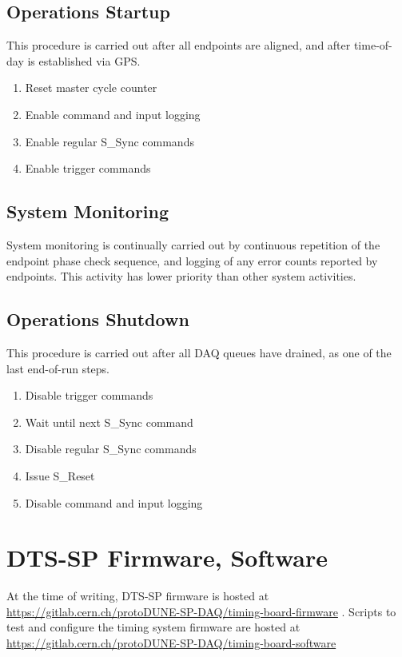 \documentclass{dune}
\begin{document}
\subsection{Operations Startup}

This procedure is carried out after all endpoints are aligned, and after time-of-day is established via GPS.

\begin{enumerate}
	\item Reset master cycle counter
	\item Enable command and input logging
	\item Enable regular S\_Sync commands
	\item Enable trigger commands
\end{enumerate}

\subsection{System Monitoring}

System monitoring is continually carried out by continuous repetition of the endpoint phase check sequence, and logging of any error counts reported by endpoints. This activity has lower priority than other system activities.

\subsection{Operations Shutdown}

This procedure is carried out after all DAQ queues have drained, as one of the last end-of-run steps.

\begin{enumerate} 
	\item Disable trigger commands
	\item Wait until next S\_Sync command
	\item Disable regular S\_Sync commands
	\item Issue S\_Reset
	\item Disable command and input logging
\end{enumerate}

\clearpage

\appendix

\section{DTS-SP Firmware, Software}

At the time of writing, DTS-SP firmware is hosted at \url{https://gitlab.cern.ch/protoDUNE-SP-DAQ/timing-board-firmware} . Scripts to test and configure the timing system firmware are hosted at \url{https://gitlab.cern.ch/protoDUNE-SP-DAQ/timing-board-software}
\end{document}
